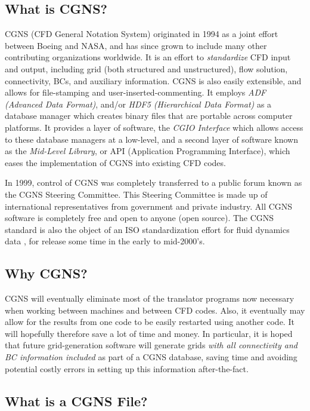 \documentclass[12pt]{article}
\begin{document}
\subsection{What is CGNS?}

CGNS (CFD General Notation System) originated in 1994
as a joint effort between Boeing and NASA, and has since grown
to include many other contributing organizations worldwide.
It is an effort to {\it standardize}
CFD input and output, including grid (both structured
and unstructured), flow solution,
connectivity, BCs, and auxiliary information.
CGNS is also easily extensible, and allows
for file-stamping and user-inserted-commenting.  It employs
\textit{ADF (Advanced Data Format)}, and/or
\textit{HDF5 (Hierarchical Data Format)}
as a database manager which creates binary files that are portable
across computer platforms. It provides a layer of software, the
\textit{CGIO Interface} which allows access
to these database managers at a low-level, and
a second layer of software known as the \textit{Mid-Level Library},
or API (Application Programming Interface), which
eases the implementation of CGNS into existing CFD codes.


In 1999, control of CGNS was completely transferred to a public
forum known as the CGNS Steering Committee.  This Steering 
Committee is made up of international representatives from 
government and private industry.  All CGNS software
is completely free and open to anyone (open source).  The
CGNS standard is also the object of an ISO standardization 
effort for fluid dynamics data \cite{POIRIER00}, for 
release some time in the early to mid-2000's.

\subsection{Why CGNS?}

CGNS will eventually eliminate most of the translator
programs now necessary when working between machines
and between CFD codes.  Also, it eventually may allow for the
results from one code to be easily restarted using another
code.  It will hopefully therefore save a lot of time and
money.  In particular, it is hoped that future grid-generation
software will generate grids {\it with all connectivity and BC
information included} as part of a CGNS database, saving 
time and avoiding potential costly errors in setting
up this information after-the-fact.

\subsection{What is a CGNS File?}
\end{document}
